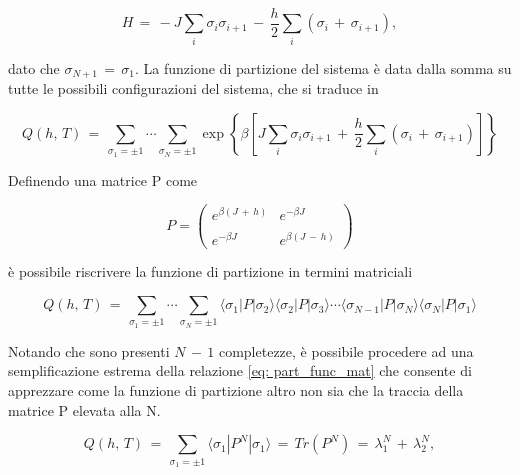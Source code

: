 \begin{equation}
    H\,=\,-J\sum_{i} \sigma_i \sigma_{i+1}\,-\,\frac{h}{2}\sum_{i} \left(\sigma_i\,+\,\sigma_{i+1}\right),
    \label{eq: ising_ham_sim}
\end{equation}

dato che $\sigma_{N+1}\,=\,\sigma_1$. La funzione di partizione del sistema è data dalla somma su tutte le possibili 
configurazioni del sistema, che si traduce in 

\begin{equation}
    Q\left(h,\,T\right)\,=\,\sum_{\sigma_1=\pm 1} \cdots \sum_{\sigma_N=\pm 1} \exp{\left\{\beta\left[J\sum_i \sigma_i \sigma_{i+1}\,+\,\frac{h}{2}\sum_i \left(\sigma_i\,+\,\sigma_{i+1}\right)\right]\right\}}
    \label{eq: part_func}
\end{equation}

Definendo una matrice P come

\begin{equation}
    P = \begin{pmatrix}
    e^{\beta\left(J\,+\,h\right)} & e^{-\beta J} \\\\
    e^{-\beta J} & e^{\beta\left(J\,-\,h\right)}
    \end{pmatrix}
    \label{eq: mat_P}
\end{equation}

è possibile riscrivere la funzione di partizione in termini matriciali

\begin{equation}
    Q\left(h,\,T\right)\,=\,\sum_{\sigma_1=\pm 1} \cdots \sum_{\sigma_N=\pm 1} \langle \sigma_1 | P | \sigma_2 \rangle \langle \sigma_2 | P | \sigma_3 \rangle \cdots \langle \sigma_{N-1} | P | \sigma_N \rangle \langle \sigma_N | P | \sigma_1 \rangle 
    \label{eq: part_func_mat}
\end{equation}

Notando che sono presenti $N\,-\,1$ completezze, è possibile procedere ad una semplificazione estrema della relazione 
\eqref{eq: part_func_mat} che consente di apprezzare come la funzione di partizione altro non sia che la traccia della matrice P 
elevata alla N. 

\begin{equation}
    Q\left(h,\,T\right)\,=\,\sum_{\sigma_1=\pm 1} \langle \sigma_1 | P^N | \sigma_1 \rangle \,=\,Tr\left(P^N\right)\,=\,\lambda_1^N\,+\,\lambda_2^N,
    \label{eq: part_func_simp}
\end{equation}

